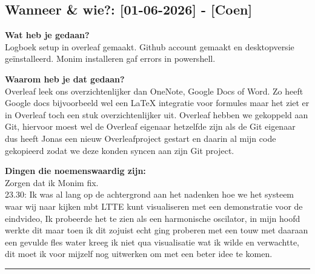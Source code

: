 \subsection*{Wanneer \& wie?: [01-06-2026] - [Coen]}

\textbf{Wat heb je gedaan?}\\
Logboek setup in overleaf gemaakt. Github account gemaakt en desktopversie geïnstalleerd. Monim installeren gaf errors in powershell.
\vspace{0.3cm} 

\textbf{Waarom heb je dat gedaan?}\\
Overleaf leek ons overzichtenlijker dan OneNote, Google Docs of Word. Zo heeft Google docs bijvoorbeeld wel een LaTeX integratie voor formules maar het ziet er in Overleaf toch een stuk overzichtenlijker uit. Overleaf hebben we gekoppeld aan Git, hiervoor moest wel de Overleaf eigenaar hetzelfde zijn als de Git eigenaar dus heeft Jonas een nieuw Overleafproject gestart en daarin al mijn code gekopieerd zodat we deze konden syncen aan zijn Git project.
\vspace{0.3cm}

\textbf{Dingen die noemenswaardig zijn:}\\
Zorgen dat ik Monim fix.\\
23.30: Ik was al lang op de achtergrond aan het nadenken hoe we het systeem waar wij naar kijken mbt LTTE kunt visualiseren met een demonstratie voor de eindvideo, Ik probeerde het te zien als een harmonische oscilator, in mijn hoofd werkte dit maar toen ik dit zojuist echt ging proberen met een touw met daaraan een gevulde fles water kreeg ik niet qua visualisatie wat ik wilde en verwachtte, dit moet ik voor mijzelf nog uitwerken om met een beter idee te komen.

\vspace{0.5cm}
\hrule 
\vspace{0.5cm}

